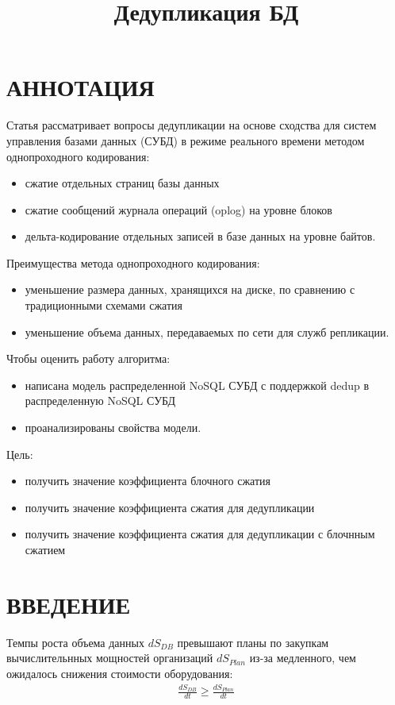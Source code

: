 \documentclass[12pt,a4paper]{article}
\title{Дедупликация БД}
\begin{document}
\maketitle
\section{АННОТАЦИЯ}
Статья рассматривает вопросы дедупликации на основе сходства для систем управления базами данных (СУБД) в режиме реального времени методом однопроходного кодирования:
\begin{itemize}
    \item сжатие отдельных страниц базы данных
    \item сжатие сообщений журнала операций (oplog) на уровне блоков
    \item дельта-кодирование отдельных записей в базе данных на уровне байтов. 
\end{itemize}

Преимущества метода однопроходного кодирования: 
\begin{itemize}
    \item  уменьшение размера данных, хранящихся на диске, по сравнению с традиционными схемами сжатия 
    \item  уменьшение объема данных, передаваемых по сети для служб репликации. 
\end{itemize}

Чтобы оценить работу алгоритма:
\begin{itemize}
    \item написана модель распределенной NoSQL СУБД с поддержкой dedup в распределенную NoSQL СУБД
    \item проанализированы свойства модели. 
\end{itemize}

Цель:
\begin{itemize}
    \item получить значение коэффициента блочного сжатия
    \item получить значение коэффициента сжатия для дедупликации
    \item получить значение коэффициента сжатия для дедупликации с блочнным сжатием
\end{itemize}

\section{ВВЕДЕНИЕ}
Темпы роста объема данных $dS_{DB}$ превышают планы по закупкам вычислительнных мощностей организаций $dS_{Plan}$ из-за медленного, чем ожидалось снижения стоимости оборудования: 
  \begin{align}
    \frac{dS_{DB}}{dt} \geq \frac{dS_{Plan}}{dt} 
  \end{align}
\end{document}
